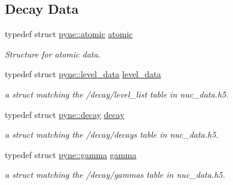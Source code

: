 \subsection*{Decay Data}
\begin{DoxyCompactItemize}
\item 
\mbox{\label{namespacepyne_abaa14a5fe8b9e50c101b962f74241928}} 
typedef struct \hyperlink{structpyne_1_1atomic}{pyne\+::atomic} \hyperlink{namespacepyne_abaa14a5fe8b9e50c101b962f74241928}{atomic}
\begin{DoxyCompactList}\small\item\em Structure for atomic data. \end{DoxyCompactList}\item 
\mbox{\label{namespacepyne_a0b3fcf211f0b5f4673867caf0d1750a8}} 
typedef struct \hyperlink{structpyne_1_1level__data}{pyne\+::level\+\_\+data} \hyperlink{namespacepyne_a0b3fcf211f0b5f4673867caf0d1750a8}{level\+\_\+data}
\begin{DoxyCompactList}\small\item\em a struct matching the \textquotesingle{}/decay/level\+\_\+list\textquotesingle{} table in nuc\+\_\+data.\+h5. \end{DoxyCompactList}\item 
\mbox{\label{namespacepyne_ad71ccbdf6a5a6d0a42d06226cffca8ff}} 
typedef struct \hyperlink{structpyne_1_1decay}{pyne\+::decay} \hyperlink{namespacepyne_ad71ccbdf6a5a6d0a42d06226cffca8ff}{decay}
\begin{DoxyCompactList}\small\item\em a struct matching the \textquotesingle{}/decay/decays\textquotesingle{} table in nuc\+\_\+data.\+h5. \end{DoxyCompactList}\item 
\mbox{\label{namespacepyne_a3deec572922f7eedfa646410158a1345}} 
typedef struct \hyperlink{structpyne_1_1gamma}{pyne\+::gamma} \hyperlink{namespacepyne_a3deec572922f7eedfa646410158a1345}{gamma}
\begin{DoxyCompactList}\small\item\em a struct matching the \textquotesingle{}/decay/gammas\textquotesingle{} table in nuc\+\_\+data.\+h5. \end{DoxyCompactList}\item 
\mbox{\label{namespacepyne_a3fc79ae6aadb879f43b288c4241ab398}} 

\end{DoxyCompactItemize}

